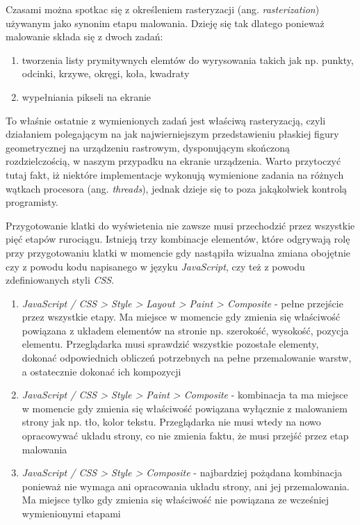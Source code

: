 \documentclass[polish, twoside, 12pt]{mwart}
\begin{document}
Czasami można spotkac się z określeniem rasteryzacji (ang. \emph{rasterization}) używanym jako synonim etapu malowania. Dzieję się tak dlatego ponieważ malowanie składa się z dwoch zadań:

\begin{enumerate}
  \item tworzenia listy prymitywnych elemtów do wyrysowania takich jak np. punkty, odcinki, krzywe, okręgi, koła, kwadraty
  \item wypełniania pikseli na ekranie
\end{enumerate}

To właśnie ostatnie z wymienionych zadań jest właściwą rasteryzacją, czyli działaniem polegającym na jak najwierniejszym przedstawieniu płaskiej figury geometrycznej na urządzeniu rastrowym, dysponującym skończoną rozdzielczością, w naszym przypadku na ekranie urządzenia. Warto przytoczyć tutaj fakt, iż niektóre implementacje wykonują wymienione zadania na różnych wątkach procesora (ang. \emph{threads}), jednak dzieje się to poza jakąkolwiek kontrolą programisty.

Przygotowanie klatki do wyświetenia nie zawsze musi przechodzić przez wszystkie pięć etapów rurociągu. Istnieją trzy kombinacje elementów, które odgrywają rolę przy przygotowaniu klatki w momencie gdy nastąpiła wizualna zmiana obojętnie czy z powodu kodu napisanego w języku \emph{JavaScript}, czy też z powodu zdefiniowanych styli \emph{CSS}.

\begin{enumerate}
  \item \emph{JavaScript / CSS > Style > Layout > Paint > Composite} - pełne przejście przez wszystkie etapy. Ma miejsce w momencie gdy zmienia się właściwość powiązana z układem elementów na stronie np. szerokość, wysokość, pozycja elementu. Przeglądarka musi sprawdzić wszystkie pozostałe elementy, dokonać odpowiednich obliczeń potrzebnych na pełne przemalowanie warstw, a ostatecznie dokonać ich kompozycji
  \item \emph{JavaScript / CSS > Style > Paint > Composite} - kombinacja ta ma miejsce w momencie gdy zmienia się właściwość powiązana wyłącznie z malowaniem strony jak np. tło, kolor tekstu. Przeglądarka nie musi wtedy na nowo opracowywać układu strony, co nie zmienia faktu, że musi przejść przez etap malowania
  \item \emph{JavaScript / CSS > Style > Composite} - najbardziej pożądana kombinacja ponieważ nie wymaga ani opracowania układu strony, ani jej przemalowania. Ma miejsce tylko gdy zmienia się właściwość nie powiązana ze wcześniej wymienionymi etapami
\end{enumerate}
\end{document}

